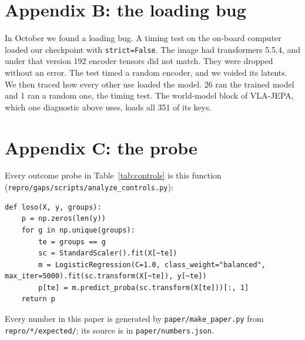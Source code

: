 \documentclass[10pt,twocolumn]{article}
\begin{document}
\section{Appendix B: the loading bug}


In October we found a loading bug. A timing test on the on-board computer loaded our checkpoint with \texttt{strict=False}. The image had transformers 5.5.4, and under that version 192 encoder tensors did not match. They were dropped without an error. The test timed a random encoder, and we voided its latents. We then traced how every other use loaded the model. 26 ran the trained model and 1 ran a random one, the timing test. The world-model block of VLA-JEPA, which one diagnostic above uses, loads all 351 of its keys.


\section{Appendix C: the probe}


Every outcome probe in Table~\ref{tab:controls} is this function (\texttt{repro/gaps/scripts/analyze\_controls.py}):


\begin{lstlisting}
def loso(X, y, groups):
    p = np.zeros(len(y))
    for g in np.unique(groups):
        te = groups == g
        sc = StandardScaler().fit(X[~te])
        m = LogisticRegression(C=1.0, class_weight="balanced", max_iter=5000).fit(sc.transform(X[~te]), y[~te])
        p[te] = m.predict_proba(sc.transform(X[te]))[:, 1]
    return p
\end{lstlisting}


Every number in this paper is generated by \texttt{paper/make\_paper.py} from \texttt{repro/*/expected/}; its source is in \texttt{paper/numbers.json}.


\end{document}

